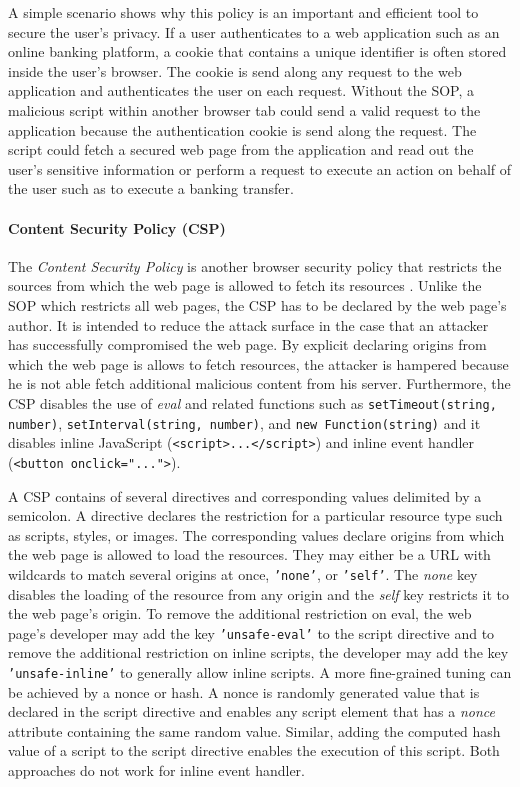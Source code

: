	A simple scenario shows why this policy is an important and efficient tool to secure the user's privacy. If a user authenticates to a web application such as an online banking platform, a cookie that contains a unique identifier is often stored inside the user's browser. The cookie is send along any request to the web application and authenticates the user on each request. Without the SOP, a malicious script within another browser tab could send a valid request to the application because the authentication cookie is send along the request. The script could fetch a secured web page from the application and read out the user's sensitive information or perform a request to execute an action on behalf of the user such as to execute a banking transfer.  
	
\paragraph{Content Security Policy (CSP)}

	The \textit{Content Security Policy} is another browser security policy that restricts the sources from which the web page is allowed to fetch its resources \cite{w3cContentSecurityPolicySpecification}. Unlike the SOP which restricts all web pages, the CSP has to be declared by the web page's author. It is intended to reduce the attack surface in the case that an attacker has successfully compromised the web page. By explicit declaring origins from which the web page is allows to fetch resources, the attacker is hampered because he is not able fetch additional malicious content from his server. Furthermore, the CSP disables the use of \textit{eval} and related functions such as \texttt{setTimeout(string, number)}, \texttt{setInterval(string, number)}, and \texttt{new Function(string)} and it disables inline JavaScript (\texttt{<script>...</script>}) and inline event handler (\texttt{<button onclick="...">}).
	
	A CSP contains of several directives and corresponding values delimited by a semicolon. A directive declares the restriction for a particular resource type such as scripts, styles, or images. The corresponding values declare origins from which the web page is allowed to load the resources. They may either be a URL with wildcards to match several origins at once, \texttt{'none'}, or \texttt{'self'}. The \textit{none} key disables the loading of the resource from any origin and the \textit{self} key restricts it to the web page's origin. To remove the additional restriction on eval, the web page's developer may add the key \texttt{'unsafe-eval'} to the script directive and to remove the additional restriction on inline scripts, the developer may add the key \texttt{'unsafe-inline'} to generally allow inline scripts. A more fine-grained tuning can be achieved by a nonce or hash. A nonce is randomly generated value that is declared in the script directive and enables any script element that has a \textit{nonce} attribute containing the same random value. Similar, adding the computed hash value of a script to the script directive enables the execution of this script. Both approaches do not work for inline event handler.
	
